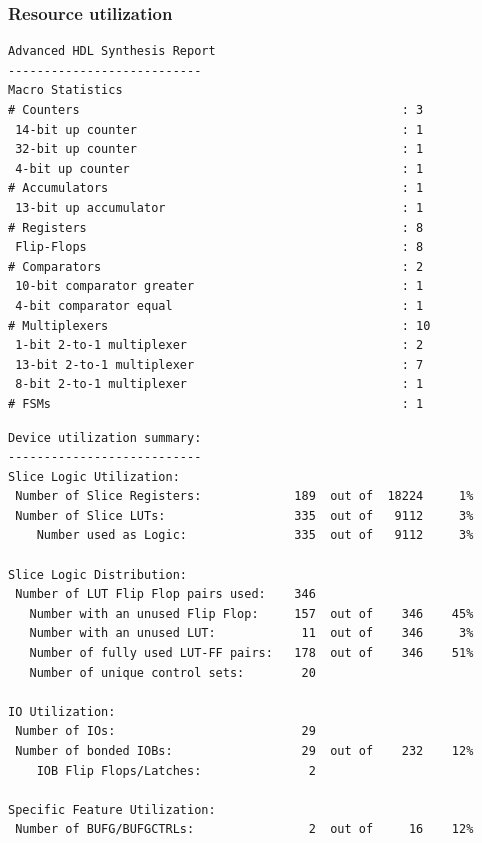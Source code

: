 \documentclass{article}
\begin{document}
    \subsubsection{Resource utilization}

   		\begin{lstlisting}
Advanced HDL Synthesis Report
---------------------------
Macro Statistics
# Counters                                             : 3
 14-bit up counter                                     : 1
 32-bit up counter                                     : 1
 4-bit up counter                                      : 1
# Accumulators                                         : 1
 13-bit up accumulator                                 : 1
# Registers                                            : 8
 Flip-Flops                                            : 8
# Comparators                                          : 2
 10-bit comparator greater                             : 1
 4-bit comparator equal                                : 1
# Multiplexers                                         : 10
 1-bit 2-to-1 multiplexer                              : 2
 13-bit 2-to-1 multiplexer                             : 7
 8-bit 2-to-1 multiplexer                              : 1
# FSMs                                                 : 1
   		\end{lstlisting}

   		\begin{lstlisting}
Device utilization summary:
---------------------------
Slice Logic Utilization: 
 Number of Slice Registers:             189  out of  18224     1%  
 Number of Slice LUTs:                  335  out of   9112     3%  
    Number used as Logic:               335  out of   9112     3%  

Slice Logic Distribution: 
 Number of LUT Flip Flop pairs used:    346
   Number with an unused Flip Flop:     157  out of    346    45%  
   Number with an unused LUT:            11  out of    346     3%  
   Number of fully used LUT-FF pairs:   178  out of    346    51%  
   Number of unique control sets:        20

IO Utilization: 
 Number of IOs:                          29
 Number of bonded IOBs:                  29  out of    232    12%  
    IOB Flip Flops/Latches:               2

Specific Feature Utilization:
 Number of BUFG/BUFGCTRLs:                2  out of     16    12%  
   		\end{lstlisting}
\end{document}
